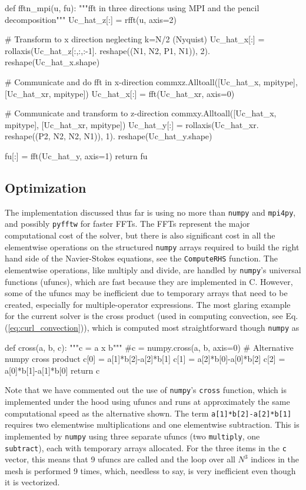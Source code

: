 \documentclass[final,1p,times]{elsarticle}
\newcommand{\inpyth}{\lstinline[style=inlinestyle]} %[]%
\begin{document}
\begin{python}
def fftn_mpi(u, fu):
    """fft in three directions using MPI and the pencil decomposition"""
    Uc_hat_z[:] = rfft(u, axis=2)

    # Transform to x direction neglecting k=N/2 (Nyquist)
    Uc_hat_x[:] = rollaxis(Uc_hat_z[:,:,:-1]. 
      reshape((N1, N2, P1, N1)), 2).  
      reshape(Uc_hat_x.shape)

    # Communicate and do fft in x-direction
    commxz.Alltoall([Uc_hat_x, mpitype], 
                    [Uc_hat_xr, mpitype])
    Uc_hat_x[:] = fft(Uc_hat_xr, axis=0)

    # Communicate and transform to z-direction
    commxy.Alltoall([Uc_hat_x, mpitype], 
                    [Uc_hat_xr, mpitype])
    Uc_hat_y[:] = rollaxis(Uc_hat_xr.
      reshape((P2, N2, N2, N1)), 1).
      reshape(Uc_hat_y.shape)

    fu[:] = fft(Uc_hat_y, axis=1)
    return fu
\end{python}

\subsection{Optimization}
\label{sec:optimization}
The implementation discussed thus far is using no more than \texttt{numpy} and \texttt{mpi4py}, and possibly \texttt{pyfftw} for faster FFTs. The FFTs represent the major computational cost of the solver, but there is also significant cost in all the elementwise operations on the structured \texttt{numpy} arrays required to build the right hand side of the Navier-Stokes equations, see the \inpyth{ComputeRHS} function. The elementwise operations, like multiply and divide, are handled by \texttt{numpy}'s universal functions (ufuncs), which are fast because they are implemented in C. However, some of the ufuncs may be inefficient due to temporary arrays that need to be created, especially for multiple-operator expressions. The most glaring example for the current solver is the cross product (used in computing convection, see Eq. (\ref{eq:curl_convection})), which is computed most straightforward though \texttt{numpy} as
\begin{python}
def cross(a, b, c):
    """c = a x b"""
    #c = numpy.cross(a, b, axis=0)   # Alternative numpy cross product
    c[0] = a[1]*b[2]-a[2]*b[1]
    c[1] = a[2]*b[0]-a[0]*b[2]
    c[2] = a[0]*b[1]-a[1]*b[0]
    return c
\end{python}
Note that we have commented out the use of \texttt{numpy}'s \inpyth{cross} function, which is implemented under the hood using ufuncs and runs at approximately the same computational speed as the alternative shown. The term \inpyth{a[1]*b[2]-a[2]*b[1]} requires two elementwise multiplications and one elementwise subtraction. This is implemented by \texttt{numpy} using three separate ufuncs (two \inpyth{multiply}, one \inpyth{subtract}), each with temporary arrays allocated. For the three items in the \inpyth{c} vector, this means that 9 ufuncs are called and the loop over all $N^3$ indices in the mesh is performed 9 times, which, needless to say, is very inefficient even though it is vectorized.
\end{document}
